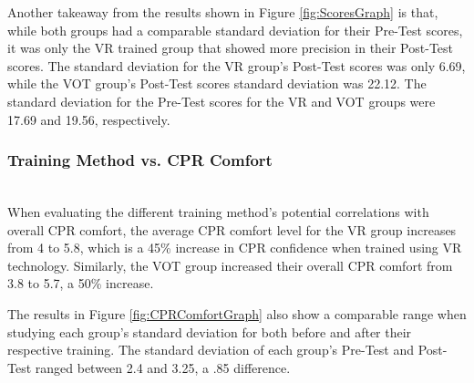 \documentclass[manuscript]{./Models/acmart}
\begin{document}
Another takeaway from the results shown in Figure \ref{fig:ScoresGraph} is that, while both groups had a comparable standard deviation for their Pre-Test scores, it was only the VR trained group that showed more precision in their Post-Test scores. The standard deviation for the VR group's Post-Test scores was only 6.69, while the VOT group's Post-Test scores standard deviation was 22.12. The standard deviation for the Pre-Test scores for the VR and VOT groups were 17.69 and 19.56, respectively.

\subsubsection{Training Method vs. CPR Comfort}
\hfill\\
When evaluating the different training method's potential correlations with overall CPR comfort, the average CPR comfort level for the VR group increases from 4 to 5.8, which is a 45\% increase in CPR confidence when trained using VR technology. Similarly, the VOT group increased their overall CPR comfort from 3.8 to 5.7, a 50\% increase.

The results in Figure \ref{fig:CPRComfortGraph} also show a comparable range when studying each group's standard deviation for both before and after their respective training. The standard deviation of each group's Pre-Test and Post-Test ranged between 2.4 and 3.25, a .85 difference.
\end{document}
